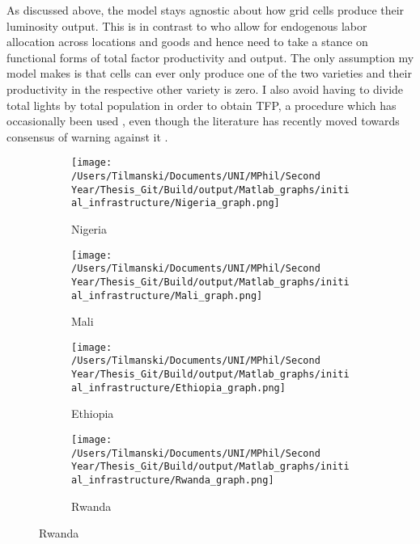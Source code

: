 \documentclass[11pt, oneside]{article}   	%
\begin{document}
As discussed above, the model stays agnostic about how grid cells produce their luminosity output. This is in contrast to \citeauthor{fajgelbaum_optimal_2017} who allow for endogenous labor allocation across locations and goods and hence need to take a stance on functional forms of total factor productivity and output. The only assumption my model makes is that cells can ever only produce one of the two varieties and their productivity in the respective other variety is zero. I also avoid having to divide total lights by total population in order to obtain TFP, a procedure which has occasionally been used \citep[see e.g.][]{DeLuca_Ethnicfavoritismaxiom_2018}, even though the literature has recently moved towards consensus of warning against it \citep{michalopoulos_spatial_2018}.

\begin{figure}[t]
\centering
\caption{Discretised Networks for different countries}

\begin{subfigure}[c]{0.45\textwidth}
\texttt{[image: /Users/Tilmanski/Documents/UNI/MPhil/Second Year/Thesis\_Git/Build/output/Matlab\_graphs/initial\_infrastructure/Nigeria\_graph.png]}
\caption{Nigeria}
\label{fig:nigeria_mat}
\end{subfigure}
\begin{subfigure}[c]{0.45\textwidth}
\texttt{[image: /Users/Tilmanski/Documents/UNI/MPhil/Second Year/Thesis\_Git/Build/output/Matlab\_graphs/initial\_infrastructure/Mali\_graph.png]}
\caption{Mali}
\label{fig:Mali_mat}
\end{subfigure}

\begin{subfigure}[c]{0.45\textwidth}
\texttt{[image: /Users/Tilmanski/Documents/UNI/MPhil/Second Year/Thesis\_Git/Build/output/Matlab\_graphs/initial\_infrastructure/Ethiopia\_graph.png]}
\caption{Ethiopia}
\label{fig:Ethiopia_mat}
\end{subfigure}
\begin{subfigure}[c]{0.45\textwidth}
\texttt{[image: /Users/Tilmanski/Documents/UNI/MPhil/Second Year/Thesis\_Git/Build/output/Matlab\_graphs/initial\_infrastructure/Rwanda\_graph.png]}
\caption{Rwanda}
\label{fig:Rwanda_mat}
\end{subfigure}
\label{fig:matlab_networks}
\end{figure}
\end{document}
